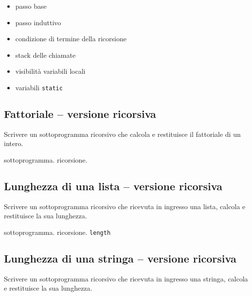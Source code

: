 \begin{itemize}
\item passo base
\item passo induttivo
\item condizione di termine della ricorsione
\item stack delle chiamate
\item visibilit\`a variabili locali
\item variabili \texttt{static}
\end{itemize}

\mysep{}

\subsection{Fattoriale -- versione ricorsiva}
Scrivere un sottoprogramma ricorsivo che calcola e restituisce il fattoriale di un intero.

\begin{tags}
sottoprogramma. ricorsione. 
\end{tags}


\subsection{Lunghezza di una lista -- versione ricorsiva}
Scrivere un sottoprogramma ricorsivo che ricevuta in ingresso una lista, calcola e restituisce la sua lunghezza.

\begin{tags}
sottoprogramma. ricorsione. 
\texttt{length}
\end{tags}


\subsection{Lunghezza di una stringa -- versione ricorsiva}
Scrivere un sottoprogramma ricorsivo che ricevuta in ingresso una stringa, calcola e restituisce la sua lunghezza.

